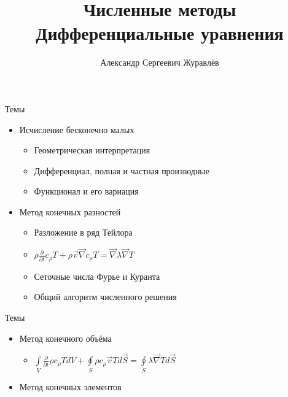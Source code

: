 \documentclass[12pt]{beamer}
\author{Александр Сергеевич Журавлёв}
\title[Дифференциальные уравнения]{Численные методы \\ Дифференциальные уравнения}
\institute{Физико-технический институт}
\begin{document}
\begin{frame}
    \titlepage
\end{frame}


\begin{frame}{Темы}
    \begin{itemize}
        \item Исчисление бесконечно малых
            \begin{itemize}
                \item Геометрическая интерпретация
                \item Дифференциал, полная и частная производные                
                \item Функционал и его вариация
            \end{itemize}
        \vspace{0.2 cm}    
        \item Метод конечных разностей
            \begin{itemize}
                \item Разложение в ряд Тейлора        
                \item $\rho \frac{\partial}{\partial t} c_{\rho} T + \rho \vec{v} \vec{\nabla} c_{\rho} T = \vec{\nabla}  \lambda \vec{\nabla} T$
                \item Сеточные числа Фурье и Куранта
                \item Общий алгоритм численного решения      
            \end{itemize}                                
    \end{itemize}
\end{frame}

\begin{frame}{Темы}
    \begin{itemize}
        \item Метод конечного объёма
            \begin{itemize}
                \item $\int \limits_{V} \frac{\partial}{\partial t} \rho c_{\rho} T dV + \oint \limits_{S}  \rho c_{\rho} \vec{v}  T d \vec{S}= \oint \limits_{S}  \lambda \vec{\nabla} T d \vec{S}$               
            \end{itemize}
        \vspace{0.2 cm}     
        \item Метод конечных элементов                             
    \end{itemize}
\end{frame}
\end{document}
